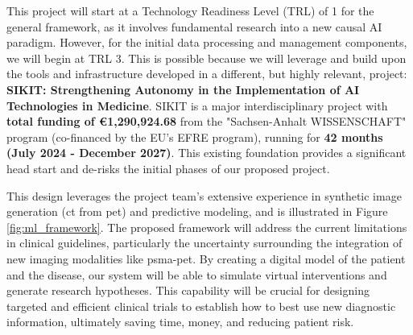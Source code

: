 \documentclass[11pt, a4paper]{article}
\begin{document}
This project will start at a Technology Readiness Level (TRL) of 1 for the general framework, as it involves fundamental research into a new causal AI paradigm. However, for the initial data processing and management components, we will begin at TRL 3. This is possible because we will leverage and build upon the tools and infrastructure developed in a different, but highly relevant, project: \textbf{SIKIT: Strengthening Autonomy in the Implementation of AI Technologies in Medicine}. SIKIT is a major interdisciplinary project with \textbf{total funding of €1,290,924.68} from the "Sachsen-Anhalt WISSENSCHAFT" program (co-financed by the EU's EFRE program), running for \textbf{42 months (July 2024 - December 2027)}. This existing foundation provides a significant head start and de-risks the initial phases of our proposed project.

This design leverages the project team's extensive experience in synthetic image generation (\gls{ct} from \gls{pet}) and predictive modeling, and is illustrated in Figure \ref{fig:ml_framework}. The proposed framework will address the current limitations in clinical guidelines, particularly the uncertainty surrounding the integration of new imaging modalities like \gls{psma}-\gls{pet}. By creating a digital model of the patient and the disease, our system will be able to simulate virtual interventions and generate research hypotheses. This capability will be crucial for designing targeted and efficient clinical trials to establish how to best use new diagnostic information, ultimately saving time, money, and reducing patient risk.
\end{document}

